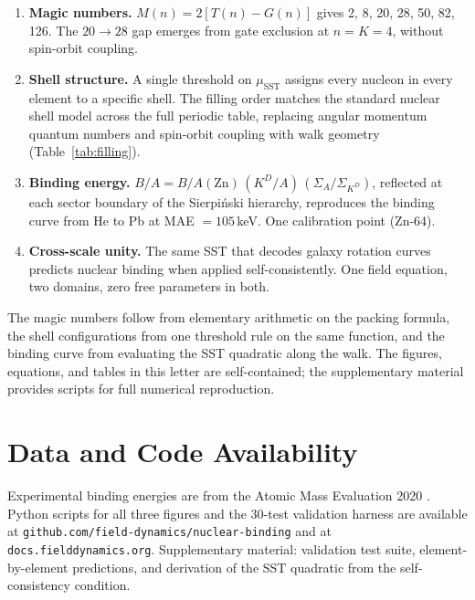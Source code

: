 \documentclass[fleqn,usenatbib]{mnras}
\begin{document}
\begin{enumerate}
\item \textbf{Magic numbers.} $M(n) = 2[T(n) - G(n)]$ gives 2, 8, 20, 28, 50, 82, 126. The $20\!\to\!28$ gap emerges from gate exclusion at $n = K = 4$, without spin-orbit coupling.
\item \textbf{Shell structure.} A single threshold on $\mu_{\mathrm{SST}}$ assigns every nucleon in every element to a specific shell. The filling order matches the standard nuclear shell model across the full periodic table, replacing angular momentum quantum numbers and spin-orbit coupling with walk geometry (Table~\ref{tab:filling}).
\item \textbf{Binding energy.} $B/A = B/A(\mathrm{Zn})\,(K^D/A)\,(\Sigma_A/\Sigma_{K^D})$, reflected at each sector boundary of the Sierpi\'nski hierarchy, reproduces the binding curve from He to Pb at MAE $= 105$\,keV. One calibration point (Zn-64).
\item \textbf{Cross-scale unity.} The same SST that decodes galaxy rotation curves predicts nuclear binding when applied self-consistently. One field equation, two domains, zero free parameters in both.
\end{enumerate}

The magic numbers follow from elementary arithmetic on the packing formula, the shell configurations from one threshold rule on the same function, and the binding curve from evaluating the SST quadratic along the walk. The figures, equations, and tables in this letter are self-contained; the supplementary material provides scripts for full numerical reproduction.

\section{Data and Code Availability}
\label{sec:data}
Experimental binding energies are from the Atomic Mass Evaluation 2020 \citep{AME2020}. Python scripts for all three figures and the 30-test validation harness are available at \texttt{github.com/field-dynamics/nuclear-binding} and at \texttt{docs.fielddynamics.org}. Supplementary material: validation test suite, element-by-element predictions, and derivation of the SST quadratic from the self-consistency condition.


\end{document}
